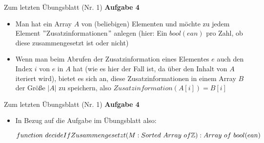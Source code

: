 







\iffalse

\begin{frame}{Zum letzten Übungsblatt (Nr. 1)}
	\textbf{Aufgabe 4} \\[0,125cm]
	\begin{itemize}
		\item Man hat ein Array $A$ von (beliebigen) Elementen und möchte zu jedem Element $"$Zusatzinformationen$"$ anlegen (hier: Ein $bool(ean)$ pro Zahl, ob diese zusammengesetzt ist oder nicht)
		\item Wenn man beim Abrufen der Zusatzinformation eines Elementes $e$ auch den Index $i$ von $e$ in $A$ hat (wie es hier der Fall ist, da über den Inhalt von $A$ iteriert wird), bietet es sich an, diese Zusatzinformationen in einem Array $B$ der Größe $|A|$ zu speichern, also $Zusatzinformation(A[i]) = B[i]$
	\end{itemize}
\end{frame}

\begin{frame}{Zum letzten Übungsblatt (Nr. 1)}
	\textbf{Aufgabe 4} \\[0,125cm]
	\begin{itemize}
		\item In Bezug auf die Aufgabe im Übungsblatt also: \\
		\footnotesize
		\begin{exampleblock}{ }
			\begin{algorithm}[H]
				\DontPrintSemicolon
				$function\ decideIfZusammengesetzt(M : Sorted\ Array\ of \mathbb{Z}) : Array\ of\ bool(ean)$\;
			\end{algorithm}
		\end{exampleblock}
	\end{itemize}
\end{frame}


